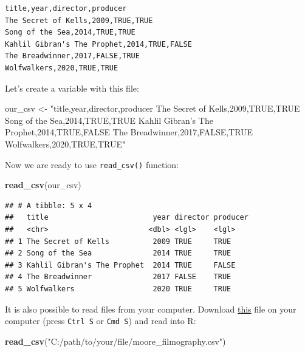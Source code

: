 \documentclass[
]{book}
\newenvironment{Shaded}{\begin{snugshade}}{\end{snugshade}}
\newcommand{\KeywordTok}[1]{\textcolor[rgb]{0.13,0.29,0.53}{\textbf{#1}}}
\newcommand{\NormalTok}[1]{#1}
\newcommand{\StringTok}[1]{\textcolor[rgb]{0.31,0.60,0.02}{#1}}
\begin{document}
\begin{verbatim}
title,year,director,producer
The Secret of Kells,2009,TRUE,TRUE
Song of the Sea,2014,TRUE,TRUE
Kahlil Gibran's The Prophet,2014,TRUE,FALSE
The Breadwinner,2017,FALSE,TRUE
Wolfwalkers,2020,TRUE,TRUE
\end{verbatim}

Let's create a variable with this file:

\begin{Shaded}
\begin{Highlighting}[]
\NormalTok{our_csv <-}\StringTok{ "title,year,director,producer}
\StringTok{The Secret of Kells,2009,TRUE,TRUE}
\StringTok{Song of the Sea,2014,TRUE,TRUE}
\StringTok{Kahlil Gibran's The Prophet,2014,TRUE,FALSE}
\StringTok{The Breadwinner,2017,FALSE,TRUE}
\StringTok{Wolfwalkers,2020,TRUE,TRUE"}
\end{Highlighting}
\end{Shaded}

Now we are ready to use \texttt{read\_csv()} function:

\begin{Shaded}
\begin{Highlighting}[]
\KeywordTok{read_csv}\NormalTok{(our_csv)}
\end{Highlighting}
\end{Shaded}

\begin{verbatim}
## # A tibble: 5 x 4
##   title                        year director producer
##   <chr>                       <dbl> <lgl>    <lgl>   
## 1 The Secret of Kells          2009 TRUE     TRUE    
## 2 Song of the Sea              2014 TRUE     TRUE    
## 3 Kahlil Gibran's The Prophet  2014 TRUE     FALSE   
## 4 The Breadwinner              2017 FALSE    TRUE    
## 5 Wolfwalkers                  2020 TRUE     TRUE
\end{verbatim}

It is also possible to read files from your computer. Download \href{https://raw.githubusercontent.com/agricolamz/2020.02_Naumburg_R/master/data/moore_filmography.csv}{this} file on your computer (press \texttt{Ctrl\ S} or \texttt{Cmd\ S}) and read into R:

\begin{Shaded}
\begin{Highlighting}[]
\KeywordTok{read_csv}\NormalTok{(}\StringTok{"C:/path/to/your/file/moore_filmography.csv"}\NormalTok{)}
\end{Highlighting}
\end{Shaded}
\end{document}
